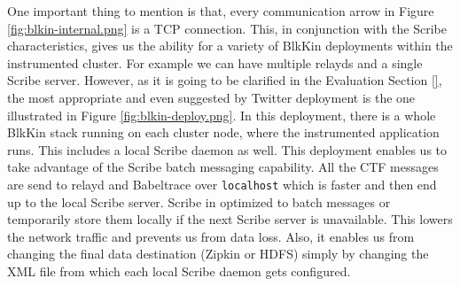One important thing to mention is that, every communication arrow in Figure
\ref{fig:blkin-internal.png} is a TCP connection. This, in conjunction with the
Scribe characteristics, gives us the ability for a variety of BlkKin deployments
within the instrumented cluster. For example we can have multiple relayds and a
single Scribe server. However, as it is going to be clarified in the Evaluation
Section \ref{}, the most appropriate and even suggested by Twitter deployment is
the one illustrated in Figure \ref{fig:blkin-deploy.png}.  In this deployment,
there is a whole BlkKin stack running on each cluster node, where the
instrumented application runs. This includes a local Scribe daemon as well. This
deployment enables us to take advantage of the Scribe batch messaging
capability. All the CTF messages are send to relayd and Babeltrace over
\texttt{localhost} which is faster and then end up to the local Scribe server.
Scribe in optimized to batch messages or temporarily store them locally if the
next Scribe server is unavailable. This lowers the network traffic and prevents
us from data loss. Also, it enables us from changing the final data destination
(Zipkin or HDFS) simply by changing the XML file from which each local Scribe
daemon gets configured. 


